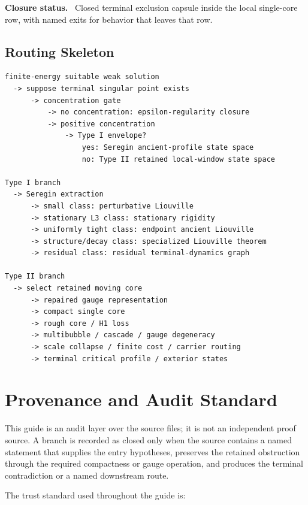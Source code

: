\documentclass[11pt]{amsart}
\newcommand{\capsulefield}[1]{\par\smallskip\noindent\textbf{#1.}\ }
\begin{document}
\capsulefield{Closure status}
Closed terminal exclusion capsule inside the local single-core row, with named
exits for behavior that leaves that row.

\subsection{Routing Skeleton}

\begin{center}
\begin{minipage}{0.92\linewidth}
\scriptsize
\begin{verbatim}
finite-energy suitable weak solution
  -> suppose terminal singular point exists
      -> concentration gate
          -> no concentration: epsilon-regularity closure
          -> positive concentration
              -> Type I envelope?
                  yes: Seregin ancient-profile state space
                  no: Type II retained local-window state space

Type I branch
  -> Seregin extraction
      -> small class: perturbative Liouville
      -> stationary L3 class: stationary rigidity
      -> uniformly tight class: endpoint ancient Liouville
      -> structure/decay class: specialized Liouville theorem
      -> residual class: residual terminal-dynamics graph

Type II branch
  -> select retained moving core
      -> repaired gauge representation
      -> compact single core
      -> rough core / H1 loss
      -> multibubble / cascade / gauge degeneracy
      -> scale collapse / finite cost / carrier routing
      -> terminal critical profile / exterior states
\end{verbatim}
\end{minipage}
\end{center}

\section{Provenance and Audit Standard}

This guide is an audit layer over the source files; it is not an independent proof source.  A branch is recorded as closed only when the source contains a named statement that supplies the entry hypotheses, preserves the retained obstruction through the required compactness or gauge operation, and produces the terminal contradiction or a named downstream route.

The trust standard used throughout the guide is:
\end{document}
